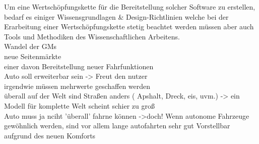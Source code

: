 Um eine Wertschöpfungskette für die Bereitstellung solcher Software zu erstellen, bedarf es einiger Wissensgrundlagen \& Design-Richtlinien welche bei der Erarbeitung einer Wertschöpfungskette stetig beachtet werden müssen aber auch Tools und Methodiken des Wissenschaftlichen Arbeitens.\\
Wandel der GMs\\
neue Seitenmärkte\\
einer davon Bereitstellung neuer Fahrfunktionen\\
Auto soll erweiterbar sein -> Freut den nutzer\\
irgendwie müssen mehrwerte geschaffen werden\\
überall auf der Welt sind Straßen anders ( Apshalt, Dreck, eis, uvm.) -> ein Modell für komplette Welt scheint schier zu groß\\
Auto muss ja nciht 'überall' fahrne können ->doch! Wenn autonome Fahrzeuge gewöhnlich werden, sind vor allem lange autofahrten sehr gut Vorstellbar aufgrund des neuen Komforts\\



\clearpage